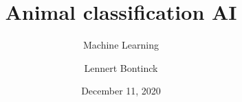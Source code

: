 \title{Animal classification AI}
\subtitle{Machine Learning}
\author{Lennert Bontinck}
\date{December 11, 2020}
